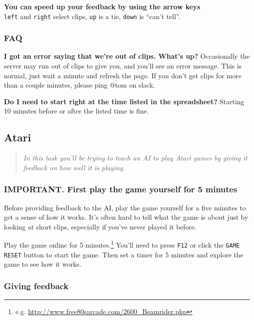 \documentclass{article}
\begin{document}
\textbf{You can speed up your feedback by using the arrow keys} \\
\texttt{left} and \texttt{right} select clips, \texttt{up} is a tie, \texttt{down} is ``can't tell''.


\subsubsection*{FAQ}

\textbf{I got an error saying that we’re out of clips. What’s up?}
Occasionally the server may run out of clips to give you, and you'll see an error message.
This is normal, just wait a minute and refresh the page.
If you don't get clips for more than a couple minutes, please ping @tom on slack.

\textbf{Do I need to start right at the time listed in the spreadsheet?}
Starting 10 minutes before or after the listed time is fine.


\subsection{Atari}

\begin{quote}\it
In this task you’ll be trying to teach an AI to play Atari games
by giving it feedback on how well it is playing.
\end{quote}

\subsubsection*{IMPORTANT. First play the game yourself for 5 minutes}

Before providing feedback to the AI,
play the game yourself for a five minutes to get a sense of how it works.
It's often hard to tell what the game is about just by looking at short clips,
especially if you've never played it before.

Play the game online for 5 minutes.\footnote{e.g. \url{http://www.free80sarcade.com/2600_Beamrider.php}}
You’ll need to press \texttt{F12} or click the \texttt{GAME RESET} button to start the game.
Then set a timer for 5 minutes and explore the game to see how it works.

\subsubsection*{Giving feedback}
\end{document}
